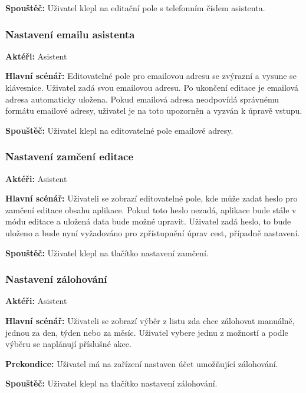 \documentclass{article}
\newcommand{\usecase}[2]{\subsubsection{#1}\label{#2}}
\begin{document}
\vspace{0.1cm}
\noindent
\textbf{Spouštěč:} Uživatel klepl na editační pole s telefonním číslem asistenta.

\usecase{Nastavení emailu asistenta}{nastaveniemailu}
\textbf{Aktéři:} Asistent

\vspace{0.1cm}
\noindent
\textbf{Hlavní scénář:} Editovatelné pole pro emailovou adresu se zvýrazní a vysune se klávesnice.
Uživatel zadá svou emailovou adresu. Po ukončení editace je emailová adresa automaticky uložena.
Pokud emailová adresa neodpovídá správnému formátu emailové adresy, uživatel je na toto upozorněn
a vyzván k úpravě vstupu.

\vspace{0.1cm}
\noindent
\textbf{Spouštěč:} Uživatel klepl na editovatelné pole emailové adresy.


\usecase{Nastavení zamčení editace}{nastavenizamceni}
\textbf{Aktéři:} Asistent

\vspace{0.1cm}
\noindent
\textbf{Hlavní scénář:} Uživateli se zobrazí editovatelné pole, kde může zadat heslo pro zamčení editace
obsahu aplikace. Pokud toto heslo nezadá, aplikace bude stále v módu editace a uložená data bude možné upravit.
Uživatel zadá heslo, to bude uloženo a bude nyní vyžadováno pro zpřístupnění úprav cest, případně nastavení.

\vspace{0.1cm}
\noindent
\textbf{Spouštěč:} Uživatel klepl na tlačítko nastavení zamčení.

\usecase{Nastavení zálohování}{nastavenizalohovani}
\textbf{Aktéři:} Asistent

\vspace{0.1cm}
\noindent
\textbf{Hlavní scénář:} Uživateli se zobrazí výběr z listu zda chce zálohovat manuálně, jednou za den, týden
nebo za měsíc. Uživatel vybere jednu z možností a podle výběru se naplánují příslušné akce.

\vspace{0.1cm}
\noindent
\textbf{Prekondice:} Uživatel má na zařízení nastaven účet umožňující zálohování.

\vspace{0.1cm}
\noindent
\textbf{Spouštěč:} Uživatel klepl na tlačítko nastavení zálohování.
\end{document}
